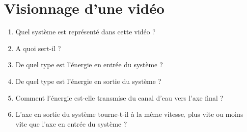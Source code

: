 \documentclass[10pt,fleqn]{article} %
\begin{document}
\chapterimage{}
%
\section{Visionnage d'une vidéo}
\begin{enumerate}
    \item   Quel système est représenté dans cette vidéo ?

    \item  A quoi sert-il ?

    \item  De quel type est l'énergie en entrée du système ?
    \item  De quel type est l'énergie en sortie du système ?
    \item Comment l'énergie est-elle transmise du canal d'eau vers l'axe final ?
    \item L'axe en sortie du système tourne-t-il à la même vitesse, plus vite ou moins vite que l'axe en entrée du système ?
\end{enumerate}
\end{document}
